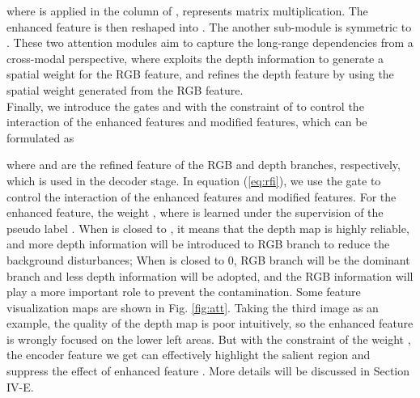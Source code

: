 \documentclass[journal]{IEEEtran}
\begin{document}
where  is applied in the column of ,  represents matrix multiplication.
The enhanced feature  is then reshaped into .
The another sub-module  is symmetric to .
These two attention modules aim to capture the long-range dependencies from a cross-modal perspective, where  exploits the depth information to generate a spatial weight for the RGB feature, and  refines the depth feature by using the spatial weight generated from the RGB feature.
\\
\indent Finally, we introduce the gates  and  with the constraint of  to control the interaction of the enhanced features and modified features, which can be formulated as

where  and  are the refined feature of the RGB and depth branches, respectively, which is used in the decoder stage.
In equation (\ref{eq:rfi}), we use the gate to control the interaction of the enhanced features and modified features. For the enhanced feature, the weight , where  is learned under the supervision of the pseudo label . When  is closed to , it means that the depth map is highly reliable, and more depth information will be introduced to RGB branch to reduce the background disturbances; When  is closed to 0, RGB branch will be the dominant branch and less depth information will be adopted, and the RGB information will play a more important role to prevent the contamination. Some feature visualization maps are shown in Fig. \ref{fig:att}. Taking the third image as an example, the quality of the depth map is poor intuitively, so the enhanced feature  is wrongly focused on the lower left areas. But with the constraint of the weight , the encoder feature we get can effectively highlight the salient region and suppress the effect of enhanced feature . More details will be discussed in Section IV-E.
\end{document}
